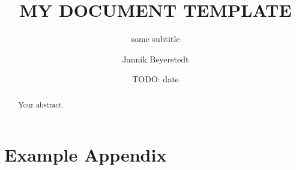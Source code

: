 \documentclass[12pt,
    pagesize,
    a4paper,
    headsepline,        %
    parskip=half,       %
    abstracton,         %
    bibliography=totoc,
]{scrreprt}             %
\begin{document}
\subject{Labor-/ Projektbericht}
\title{MY DOCUMENT TEMPLATE}
\subtitle{some subtitle}
\author{Jannik Beyerstedt}
\date{TODO: date}
\publishers{\$vorlesung, WiSe/ SoSe~\$jahr\\
Master Informations- und Kommunikationstechnik\\
\vspace{4em} \small
Hochschule für Angewandte Wissenschaften Hamburg\\
Fakultät Technik und Informatik\\
Department Informations- und Elektrotechnik\\
\vspace{2em} \texttt{[image: -settings/logo-haw-2017.png]}}

\maketitle
\newpage

\begin{abstract}
Your abstract.
\end{abstract}

\tableofcontents
\listoftables
\listoffigures
\lstlistoflistings
\printnomenclature

\newpage





\clearpage
\begin{flushleft}
\printbibliography
\end{flushleft}

\printglossaries

\appendix
\chapter{Example Appendix}

\widetext{-1.25cm}{-1.5cm}{

}
\end{document}
